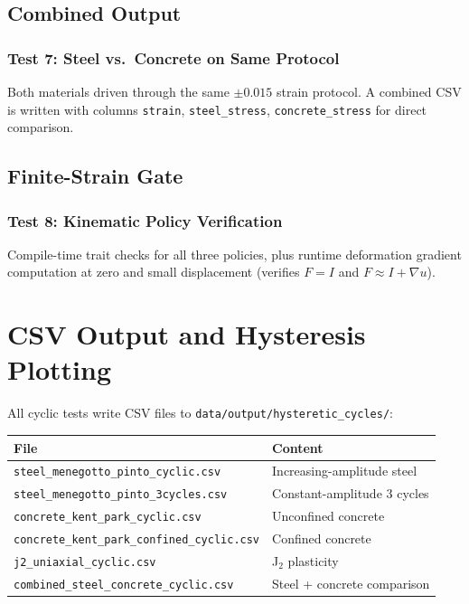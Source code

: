 \subsection{Combined Output}

\subsubsection*{Test 7: Steel vs.\ Concrete on Same Protocol}

Both materials driven through the same $\pm 0.015$ strain protocol.
A combined CSV is written with columns \texttt{strain},
\texttt{steel\_stress}, \texttt{concrete\_stress} for direct comparison.

\subsection{Finite-Strain Gate}

\subsubsection*{Test 8: Kinematic Policy Verification}

Compile-time trait checks for all three policies, plus runtime
deformation gradient computation at zero and small displacement (verifies
$F = I$ and $F \approx I + \nabla u$).


\section{CSV Output and Hysteresis Plotting}
\label{sec:phase4-csv-plotting}

All cyclic tests write CSV files to
\texttt{data/output/hysteretic\_cycles/}:

\begin{center}
\begin{tabular}{ll}
  \toprule
  File & Content \\
  \midrule
  \texttt{steel\_menegotto\_pinto\_cyclic.csv}         & Increasing-amplitude steel \\
  \texttt{steel\_menegotto\_pinto\_3cycles.csv}         & Constant-amplitude 3 cycles \\
  \texttt{concrete\_kent\_park\_cyclic.csv}             & Unconfined concrete \\
  \texttt{concrete\_kent\_park\_confined\_cyclic.csv}   & Confined concrete \\
  \texttt{j2\_uniaxial\_cyclic.csv}                    & J$_2$ plasticity \\
  \texttt{combined\_steel\_concrete\_cyclic.csv}        & Steel + concrete comparison \\
  \bottomrule
\end{tabular}
\end{center}


